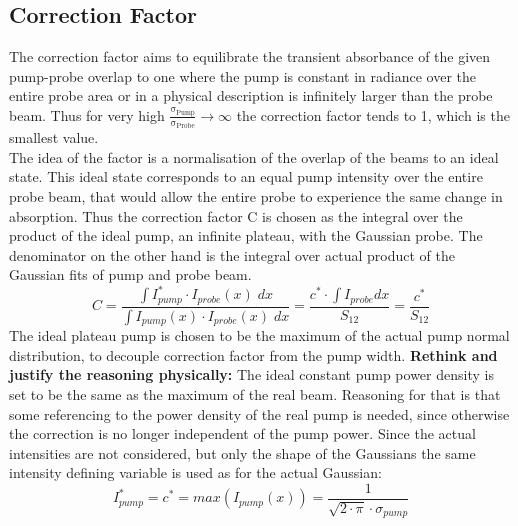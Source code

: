 \documentclass[twoside,openright]{scrreprt}
\begin{document}
\subsection{Correction Factor}\label{sec:CorrFactor}
The correction factor aims to equilibrate the transient absorbance of the given pump-probe overlap to one where the pump is constant in radiance over the entire probe area or in a physical description is infinitely larger than the probe beam. 
Thus for very high $\mathrm{\frac{\sigma_{Pump}}{\sigma_{Probe}} \rightarrow \infty}$ the correction factor tends to 1, which is the smallest value.\\
The idea of the factor is a normalisation of the overlap of the beams to an ideal state. This ideal state corresponds to an equal pump intensity over the entire probe beam, that would allow the entire probe to experience the same change in absorption. Thus the correction factor C is chosen as the integral over the product of the ideal pump, an infinite plateau, with the Gaussian probe. The denominator on the other hand is the integral over actual product of the Gaussian fits of pump and probe beam.
\begin{equation}\label{eq:CorrFactorGaussians}
C = \dfrac{\int I_{pump}^*\cdot I_{probe}(x) \;dx}{\int I_{pump}(x)\cdot I_{probe}(x) \; dx} = \dfrac{c^*\cdot \int I_{probe} dx}{S_{12}} = \dfrac{c^*}{S_{12}}
\end{equation}
The ideal plateau pump is chosen to be the maximum of the actual pump normal distribution, to decouple correction factor from the pump width. \textbf{Rethink and justify the reasoning physically:  } The ideal constant pump power density is set to be the same as the maximum of the real beam. Reasoning for that is that some referencing to the power density of the real pump is needed, since otherwise the correction is no longer independent of the pump power. Since the actual intensities are not considered, but only the shape of the Gaussians the same intensity defining variable is used as for the actual Gaussian:
\begin{equation*}
I_{pump}^* = c^* = max(I_{pump}(x)) = \frac{1}{\sqrt{2\cdot\pi}\cdot\sigma_{pump}}
\end{equation*}
\end{document}
